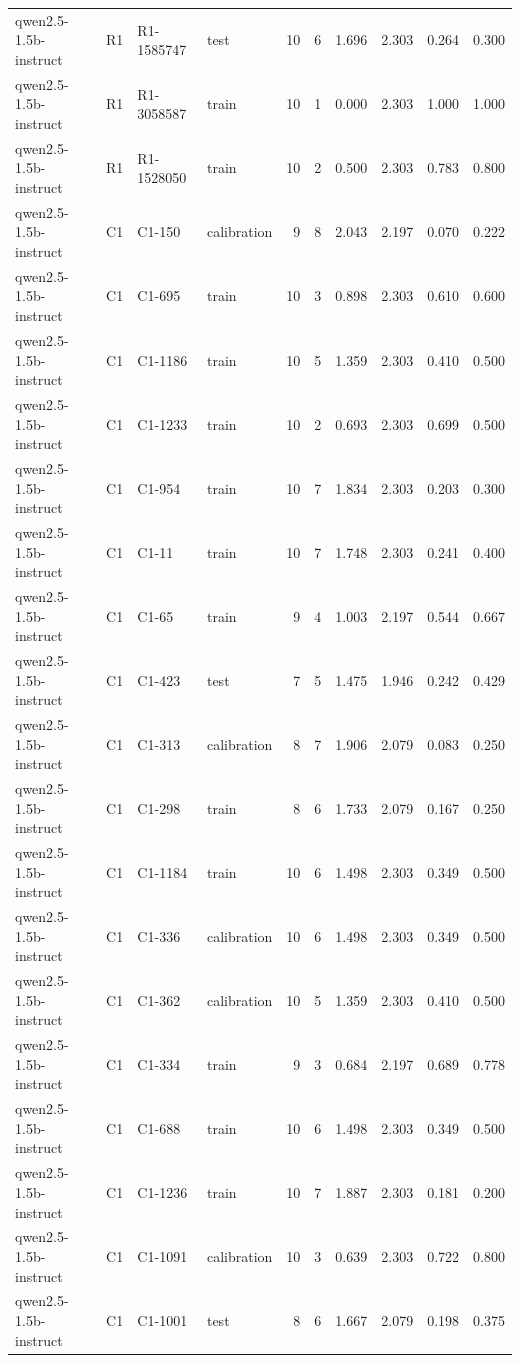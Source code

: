 \begin{table}
\begin{tabular}{llllrrrrrr}
qwen2.5-1.5b-instruct & R1 & R1-1585747 & test & 10 & 6 & 1.696 & 2.303 & 0.264 & 0.300 \\
qwen2.5-1.5b-instruct & R1 & R1-3058587 & train & 10 & 1 & 0.000 & 2.303 & 1.000 & 1.000 \\
qwen2.5-1.5b-instruct & R1 & R1-1528050 & train & 10 & 2 & 0.500 & 2.303 & 0.783 & 0.800 \\
qwen2.5-1.5b-instruct & C1 & C1-150 & calibration & 9 & 8 & 2.043 & 2.197 & 0.070 & 0.222 \\
qwen2.5-1.5b-instruct & C1 & C1-695 & train & 10 & 3 & 0.898 & 2.303 & 0.610 & 0.600 \\
qwen2.5-1.5b-instruct & C1 & C1-1186 & train & 10 & 5 & 1.359 & 2.303 & 0.410 & 0.500 \\
qwen2.5-1.5b-instruct & C1 & C1-1233 & train & 10 & 2 & 0.693 & 2.303 & 0.699 & 0.500 \\
qwen2.5-1.5b-instruct & C1 & C1-954 & train & 10 & 7 & 1.834 & 2.303 & 0.203 & 0.300 \\
qwen2.5-1.5b-instruct & C1 & C1-11 & train & 10 & 7 & 1.748 & 2.303 & 0.241 & 0.400 \\
qwen2.5-1.5b-instruct & C1 & C1-65 & train & 9 & 4 & 1.003 & 2.197 & 0.544 & 0.667 \\
qwen2.5-1.5b-instruct & C1 & C1-423 & test & 7 & 5 & 1.475 & 1.946 & 0.242 & 0.429 \\
qwen2.5-1.5b-instruct & C1 & C1-313 & calibration & 8 & 7 & 1.906 & 2.079 & 0.083 & 0.250 \\
qwen2.5-1.5b-instruct & C1 & C1-298 & train & 8 & 6 & 1.733 & 2.079 & 0.167 & 0.250 \\
qwen2.5-1.5b-instruct & C1 & C1-1184 & train & 10 & 6 & 1.498 & 2.303 & 0.349 & 0.500 \\
qwen2.5-1.5b-instruct & C1 & C1-336 & calibration & 10 & 6 & 1.498 & 2.303 & 0.349 & 0.500 \\
qwen2.5-1.5b-instruct & C1 & C1-362 & calibration & 10 & 5 & 1.359 & 2.303 & 0.410 & 0.500 \\
qwen2.5-1.5b-instruct & C1 & C1-334 & train & 9 & 3 & 0.684 & 2.197 & 0.689 & 0.778 \\
qwen2.5-1.5b-instruct & C1 & C1-688 & train & 10 & 6 & 1.498 & 2.303 & 0.349 & 0.500 \\
qwen2.5-1.5b-instruct & C1 & C1-1236 & train & 10 & 7 & 1.887 & 2.303 & 0.181 & 0.200 \\
qwen2.5-1.5b-instruct & C1 & C1-1091 & calibration & 10 & 3 & 0.639 & 2.303 & 0.722 & 0.800 \\
qwen2.5-1.5b-instruct & C1 & C1-1001 & test & 8 & 6 & 1.667 & 2.079 & 0.198 & 0.375 \\

\end{tabular}
\end{table}
